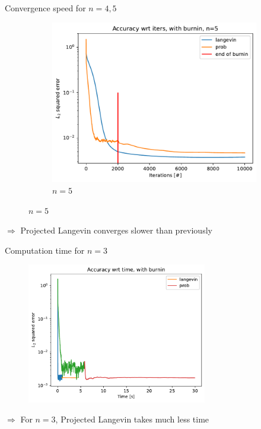 \documentclass{beamer}
\begin{document}
\begin{frame}{Convergence speed for $n=4,5$}
\begin{figure}[ht]
\begin{subfigure}[b]{0.49\textwidth}
    
            \centering
            \includegraphics[width=\linewidth]{figures/experiments/baseline/diff_n_qubits/iters_acc_comp_iters_no_avg_n5-1.png}
            \caption{$n=5$}
        \end{subfigure}
   
    \end{figure}
    $\Longrightarrow$ Projected Langevin converges slower than previously
\end{frame}
    
\begin{frame}{Computation time for $n=3$}
    
    \begin{figure}[H]
        \centering
    
        \includegraphics[width=0.7\textwidth]{figures/experiments/baseline/diff_n_qubits/iters_acc_comp_time_no_avg-1.png}


    \end{figure}
    $\Longrightarrow$ For $n=3$, Projected Langevin takes much less time
\end{frame}
\end{document}
